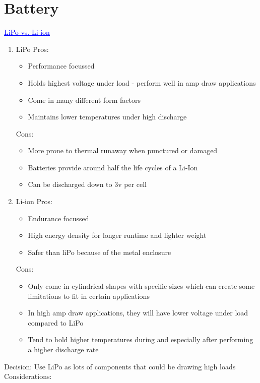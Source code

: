 \section{Battery}
\href{https://www.unmannedsystemstechnology.com/feature/lipo-vs-lithium-ion-batteries-for-unmanned-robotics-applications/#:~:text=When%20deciding%20on%20a%20battery,probably%20the%20way%20to%20go.}{\textcolor{blue}{\underline{LiPo vs. Li-ion}}}
	\begin{enumerate}
		\item LiPo
		Pros:
		\begin{itemize}
			\item Performance focussed
			\item Holds highest voltage under load - perform well in amp draw applications
			\item Come in many different form factors
			\item Maintains lower temperatures under high discharge
		\end{itemize}
		Cons:
		\begin{itemize}
			\item More prone to thermal runaway when punctured or damaged
			\item Batteries provide around half the life cycles of a Li-Ion
			\item Can be discharged down to 3v per cell
		\end{itemize}
		\item Li-ion
		Pros:
		\begin{itemize}
			\item Endurance focussed
			\item High energy density for longer runtime and lighter weight
			\item Safer than liPo because of the metal enclosure
		\end{itemize}
		Cons:
		\begin{itemize}
			\item Only come in cylindrical shapes with specific sizes which can create some limitations to fit in certain applications
			\item In high amp draw applications, they will have lower voltage under load compared to LiPo
			\item Tend to hold higher temperatures during and especially after performing a higher discharge rate
		\end{itemize}
	\end{enumerate}
	Decision: Use LiPo as lots of components that could be drawing high loads
	Considerations:


